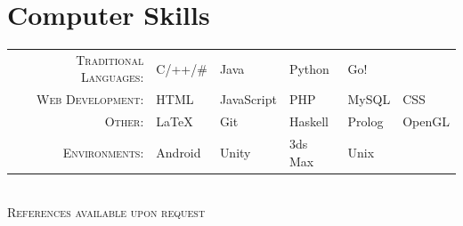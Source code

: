 \documentclass[a4paper,10pt]{article}
\begin{document}
	\section{Computer Skills}
	\def\arraystretch{1.2}%
	\begin{tabu}to \textwidth{r X[c] X[c] X[c] X[c] X[c]}
		\textsc{Traditional Languages:}		&	C/++/\#   &   Java		&	Python	&   Go! &		\\
		\textsc{Web Development:}		    &	 HTML     &   JavaScript&	PHP		&	MySQL    &  CSS	\\
		\textsc{Other:}				        & 	LaTeX     &   Git	    &   Haskell &   Prolog   &  OpenGL	\\
		\textsc{Environments:}		        &	Android   &   Unity		&	3ds Max	&	Unix     &		\\
	\end{tabu}
	\\[0.cm]
	
	\centering\textsc{ References available upon request}
	
\end{document}
